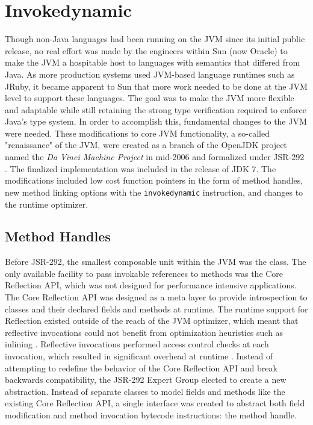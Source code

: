\chapter{Invokedynamic}
\label{chapter:Invokedynamic}
\lhead{ \leftmark }

Though non-Java languages had been running on the JVM since its initial public release, no real effort was made by the engineers within Sun (now Oracle) to make the JVM a hospitable host to languages with semantics that differed from Java.  As more production systems used JVM-based language runtimes such as JRuby, it became apparent to Sun that more work needed to be done at the JVM  level to support these languages.  The goal was to make the JVM more flexible and adaptable while still retaining the strong type verification required to enforce Java's type system.  In order to accomplish this, fundamental changes to the JVM were needed.  These modifications to core JVM functionality, a so-called "renaissance" of the JVM, were created as a branch of the OpenJDK project named the \emph{Da Vinci Machine Project} in mid-2006 and formalized under JSR-292 \cite{jsr-292}.  The finalized implementation was included in the release of JDK 7.  The modifications included low cost function pointers in the form of method handles, new method linking options with the \texttt{invokedynamic} instruction, and changes to the runtime optimizer.

\section{Method Handles}

Before JSR-292, the smallest composable unit within the JVM was the class.  The only available facility to pass invokable references to methods was the Core Reflection API, which was not designed for performance intensive applications.  The Core Reflection API was designed as a meta layer to provide introspection to classes and their declared fields and methods at runtime.  The runtime support for Reflection existed outside of the reach of the JVM optimizer, which meant that reflective invocations could not benefit from optimization heuristics such as inlining \cite{jrose-methodhandles}.  Reflective invocations performed access control checks at each invocation, which resulted in significant overhead at runtime \cite{vmil09}.  Instead of attempting to redefine the behavior of the Core Reflection API and break backwards compatibility, the JSR-292 Expert Group elected to create a new abstraction.  Instead of separate classes to model fields and methods like the existing Core Reflection API, a single interface was created to abstract both field modification and method invocation bytecode instructions: the method handle.

